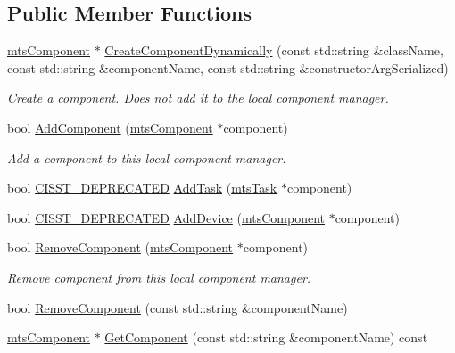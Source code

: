\subsection*{Public Member Functions}
\begin{DoxyCompactItemize}
\item 
\hyperlink{classmts_component}{mts\-Component} $\ast$ \hyperlink{classmts_manager_local_a4e139dea89d4a31bde99039e06544eef}{Create\-Component\-Dynamically} (const std\-::string \&class\-Name, const std\-::string \&component\-Name, const std\-::string \&constructor\-Arg\-Serialized)
\begin{DoxyCompactList}\small\item\em Create a component. Does not add it to the local component manager. \end{DoxyCompactList}\item 
bool \hyperlink{classmts_manager_local_a6e5cdc58e96867f5c5a64029d09dd0ab}{Add\-Component} (\hyperlink{classmts_component}{mts\-Component} $\ast$component)
\begin{DoxyCompactList}\small\item\em Add a component to this local component manager. \end{DoxyCompactList}\item 
bool \hyperlink{cmn_portability_8h_a63da7164735f9501be651b1f2bbc0121}{C\-I\-S\-S\-T\-\_\-\-D\-E\-P\-R\-E\-C\-A\-T\-E\-D} \hyperlink{classmts_manager_local_ad3af6da6429d0a32136a4d99860be415}{Add\-Task} (\hyperlink{classmts_task}{mts\-Task} $\ast$component)
\item 
bool \hyperlink{cmn_portability_8h_a63da7164735f9501be651b1f2bbc0121}{C\-I\-S\-S\-T\-\_\-\-D\-E\-P\-R\-E\-C\-A\-T\-E\-D} \hyperlink{classmts_manager_local_afc0bff17b131efa51a277085a22f0f5c}{Add\-Device} (\hyperlink{classmts_component}{mts\-Component} $\ast$component)
\item 
bool \hyperlink{classmts_manager_local_a25f28571c9ff7c60a78e5753020d2971}{Remove\-Component} (\hyperlink{classmts_component}{mts\-Component} $\ast$component)
\begin{DoxyCompactList}\small\item\em Remove component from this local component manager. \end{DoxyCompactList}\item 
bool \hyperlink{classmts_manager_local_a137be62a7188c0fc0efb7130efac2ca5}{Remove\-Component} (const std\-::string \&component\-Name)
\item 
\hyperlink{classmts_component}{mts\-Component} $\ast$ \hyperlink{classmts_manager_local_a2ea0b384d25496b455a55b18883b99b8}{Get\-Component} (const std\-::string \&component\-Name) const 

\end{DoxyCompactItemize}
